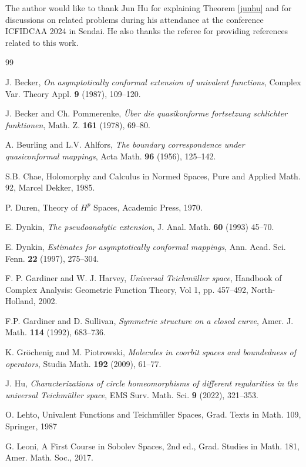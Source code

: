 \documentclass[amstex]{amsart}
\theoremstyle{definition}
\theoremstyle{remark}
\numberwithin{equation}{section}
\begin{document}
The author would like to thank Jun Hu for explaining Theorem \ref{junhu} and
for discussions on related problems during his attendance at the conference ICFIDCAA 2024 in Sendai.
He also thanks the referee for providing references related to this work.



\begin{thebibliography}{99}


 J. Becker, {\it On asymptotically conformal extension of univalent functions}, Complex Var. Theory Appl. {\bf 9} (1987), 109--120. 

 J. Becker and Ch. Pommerenke,
{\it \"Uber die quasikonforme fortsetzung schlichter funktionen}, Math. Z. {\bf 161} (1978), 69--80.

 A. Beurling and L.V. Ahlfors, {\it The boundary correspondence under quasiconformal mappings}, Acta Math. {\bf 96} (1956), 125--142.

 S.B. Chae, Holomorphy and Calculus in Normed Spaces, 
Pure and Applied Math. 92, Marcel Dekker, 1985.

 P. Duren, Theory of $H^p$ Spaces, Academic Press, 1970.

E. Dyn\cprime kin, {\it The pseudoanalytic extension}, J. Anal. Math. {\bf 60} (1993) 45--70.

E. Dyn\cprime kin,
{\it Estimates for asymptotically conformal mappings},
Ann. Acad. Sci. Fenn. {\bf 22} (1997), 275--304.

 F. P. Gardiner and W. J. Harvey, {\it Universal Teichm\"uller space}, 
Handbook of Complex Analysis: Geometric Function Theory, Vol 1, pp. 457--492, North-Holland, 2002.

 F.P. Gardiner and D. Sullivan, {\it Symmetric structure on a closed curve}, Amer. J. Math. {\bf 114} (1992), 683--736. 

 K. Gr\"ochenig and M. Piotrowski, {\it Molecules in coorbit spaces and boundedness of operators}, 
Studia Math. {\bf 192} (2009), 61--77.

 J. Hu, {\it Characterizations of circle homeomorphisms of different
regularities in the universal Teich\-m\"ul\-ler space}, EMS Surv. Math. Sci. {\bf 9} (2022), 321--353.

 O. Lehto, 
Univalent Functions and Teich\-m\"ul\-ler Spaces, 
Grad. Texts in Math. 109, Springer, 1987

 G. Leoni, A First Course in Sobolev Spaces, 2nd ed., Grad. Studies in Math. 181, Amer. Math. Soc., 2017.


\end{thebibliography}
\end{document}

